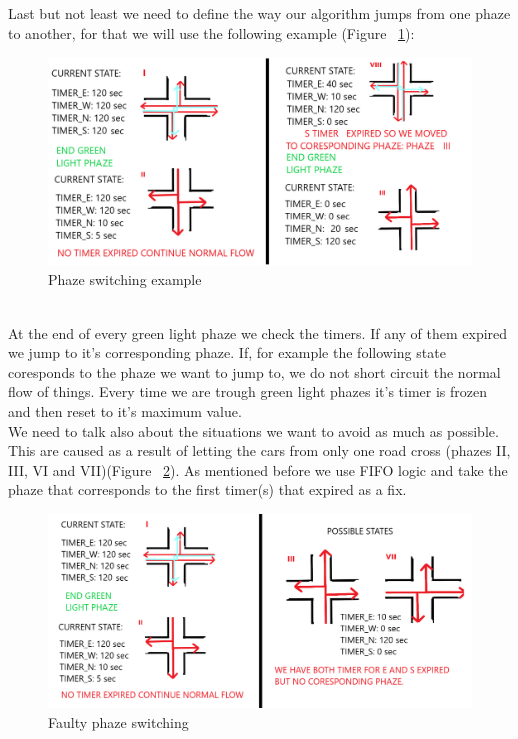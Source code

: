 \documentclass[17pt]{article}
\begin{document}
\indent \indent
Last but not least we need to define the way our algorithm jumps from one phaze to 
another, for that we will use the following example
(Figure ~\ref{fig:PhazesSwitchingExample}):
\begin{figure}[h!]
    \includegraphics[width=\textwidth]{Sketches/SwitchingTroughPhazesExample.png}
    \caption{Phaze switching example}
    \label{fig:PhazesSwitchingExample}
\end{figure}
\\
\indent \indent
At the end of every green light phaze we check the timers. If any of 
them expired we jump to it's corresponding phaze. If, for example the following state
coresponds to the phaze we want to jump to, we do not short circuit the normal flow of
things. Every time we are trough green light phazes it's timer is frozen and then 
reset to it's maximum value.\\
\indent \indent
We need to talk also about the situations we want to avoid
as much as possible. This are caused as a result of letting the cars from only one
road cross (phazes II, III, VI and VII)(Figure ~\ref{fig:FaultyPhazeSwitching}). 
As mentioned before we use FIFO logic and take the phaze that corresponds to the first 
timer(s) that expired as a fix.
\begin{figure}[h!]
    \includegraphics[width=\textwidth]{Sketches/PhazeSwitchingCaseToBeAvoided.png}
    \caption{Faulty phaze switching}
    \label{fig:FaultyPhazeSwitching}
\end{figure}
\end{document}

